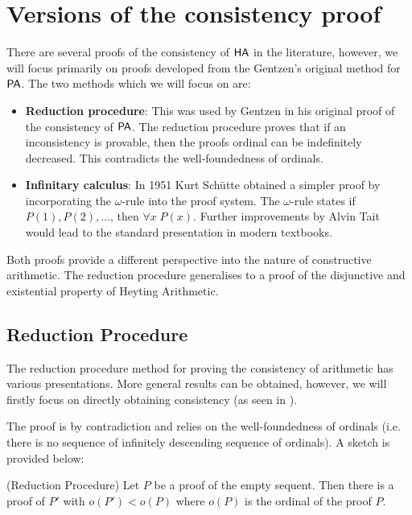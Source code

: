 \chapter{Versions of the consistency proof}

There are several proofs of the consistency of $\textsf{HA}$ in the literature, however, we will focus primarily on proofs developed from the Gentzen's original method for $\textsf{PA}$. The two methods which we will focus on are:

\begin{itemize}
    \item \textbf{Reduction procedure}: This was used by Gentzen in his original proof of the consistency of $\textsf{PA}$. The reduction procedure proves that if an inconsistency is provable, then the proofs ordinal can be indefinitely decreased. This contradicts the well-foundedness of ordinals.
    \item \textbf{Infinitary calculus}: In 1951 Kurt Sch\"utte obtained a simpler proof \cite{SCH51} by incorporating the $\omega$-rule into the proof system. The $\omega$-rule states if $P(1), P(2), \dots$, then $\forall x\;P(x)$. Further improvements by Alvin Tait would lead to the standard presentation in modern textbooks.
\end{itemize}

Both proofs provide a different perspective into the nature of constructive arithmetic. The reduction procedure generalises to a proof of the disjunctive and existential property of Heyting Arithmetic. 

\section{Reduction Procedure}

The reduction procedure method for proving the consistency of arithmetic has various presentations. More general results can be obtained, however, we will firstly focus on directly obtaining consistency (as seen in \cite{SID15}).

The proof is by contradiction and relies on the well-foundedness of ordinals (i.e. there is no sequence of infinitely descending sequence of ordinals). A sketch is provided below:

\begin{cththeorem}{(Reduction Procedure)}
Let $P$ be a proof of the empty sequent. Then there is a proof of $P'$ with $o(P') < o(P)$ where $o(P)$ is the ordinal of the proof $P$.
\end{cththeorem}

